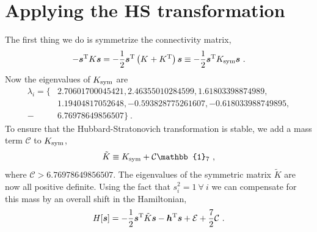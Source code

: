 \documentclass[11pt]{article}
\begin{document}
\section{Applying the HS transformation}
The first thing we do is symmetrize the connectivity matrix, 
\begin{equation}
-\bm s^{\rm T}K\bm s =-\frac{1}{2}\bm s^{\rm T}\left(K^{}+K^{\rm T}\right)\bm s\equiv-\frac{1}{2}\bm s^{\rm T}K_{\rm sym}\bm s\ .
\end{equation}
Now the eigenvalues of $K_{\rm sym}$ are
\begin{align*}
\lambda_i = \{&2.70601700045421, 2.46355010284599, 1.61803398874989, \\
&1.19404817052648, -0.593828775261607, -0.618033988749895,\\ 
-&6.76978649856507\}\ .
\end{align*}
To ensure that the Hubbard-Stratonovich transformation is stable, we add a mass term $\mathcal{C}$ to $K_{\rm sym}$,
\begin{equation}
\tilde K \equiv K_{\rm sym}+\mathcal{C}\mathbb{1}_7\ ,
\end{equation}
where $\mathcal{C}> 6.76978649856507$.  The eigenvalues of the symmetric matrix $\tilde K$ are now all positive definite.  Using the fact that $s_i^2=1\ \forall\  i$ we can compensate for this mass by an overall shift in the Hamiltonian,
\begin{equation}
H[\bm s]=-\frac{1}{2}\bm s^{\rm T}\tilde K\bm s-\bm h^{\rm T}\bm s+\mathcal{E}+\frac{7}{2}\mathcal{C}\ .
\end{equation}
\end{document}
